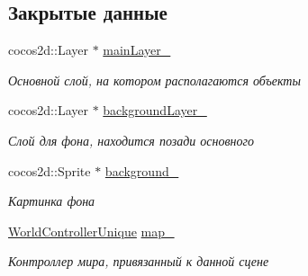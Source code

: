 \subsection*{Закрытые данные}
\begin{DoxyCompactItemize}
\item 
\mbox{\label{classrtm_1_1_world_scene_afe6808b7207547ebc943703aef5bc9a3}} 
cocos2d\+::\+Layer $\ast$ \hyperlink{classrtm_1_1_world_scene_afe6808b7207547ebc943703aef5bc9a3}{main\+Layer\+\_\+}
\begin{DoxyCompactList}\small\item\em Основной слой, на котором располагаются объекты \end{DoxyCompactList}\item 
\mbox{\label{classrtm_1_1_world_scene_af62b6508563ea62727b1e0de1e5b8f29}} 
cocos2d\+::\+Layer $\ast$ \hyperlink{classrtm_1_1_world_scene_af62b6508563ea62727b1e0de1e5b8f29}{background\+Layer\+\_\+}
\begin{DoxyCompactList}\small\item\em Слой для фона, находится позади основного \end{DoxyCompactList}\item 
\mbox{\label{classrtm_1_1_world_scene_a54e214aa6a90e7f0b642fe18e8b41005}} 
cocos2d\+::\+Sprite $\ast$ \hyperlink{classrtm_1_1_world_scene_a54e214aa6a90e7f0b642fe18e8b41005}{background\+\_\+}
\begin{DoxyCompactList}\small\item\em Картинка фона \end{DoxyCompactList}\item 
\mbox{\label{classrtm_1_1_world_scene_abe24bd4ebb294d42d0e60294247b9c1f}} 
\hyperlink{namespacertm_a3081db54851f6008db32c1ee28d14ecf}{World\+Controller\+Unique} \hyperlink{classrtm_1_1_world_scene_abe24bd4ebb294d42d0e60294247b9c1f}{map\+\_\+}
\begin{DoxyCompactList}\small\item\em Контроллер мира, привязанный к данной сцене \end{DoxyCompactList}\item 
\mbox{\label{classrtm_1_1_world_scene_aa4a3b966ceb38ca3cfca6216a379a776}} 

\end{DoxyCompactItemize}
